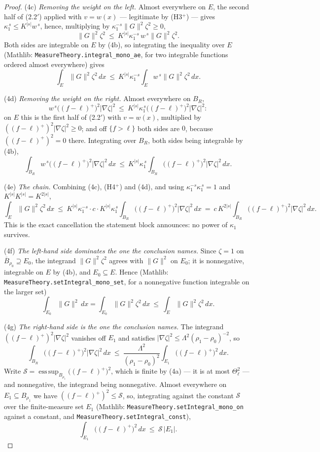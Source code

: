 \begin{proof}
\textup{(4c)} \emph{Removing the weight on the left.}  Almost everywhere on $E$,
the second half of (2.2$'$) applied with $v=w(x)$ --- legitimate by (H3$^+$) ---
gives $\kappa_1^{\,s}\le K^{|s|}w^{\,s}$, hence, multiplying by
$\kappa_1^{-s}\|G\|^2\zeta^2\ge0$,
\[
\|G\|^2\zeta^2\ \le\ K^{|s|}\kappa_1^{-s}\,w^{\,s}\|G\|^2\zeta^2 .
\]
Both sides are integrable on $E$ by (4b), so integrating the inequality over $E$
(Mathlib: \texttt{MeasureTheory.integral\_mono\_ae}, for two integrable
functions ordered almost everywhere) gives
\[
\int_E\|G\|^2\zeta^2\,dx\ \le\ K^{|s|}\kappa_1^{-s}\int_Ew^{\,s}\|G\|^2\zeta^2\,dx .
\]

\textup{(4d)} \emph{Removing the weight on the right.}  Almost everywhere on
$B_R$,
\[
w^{\,s}\bigl((f-\ell)^+\bigr)^2|\nabla\zeta|^2
\ \le\ K^{|s|}\kappa_1^{\,s}\bigl((f-\ell)^+\bigr)^2|\nabla\zeta|^2 :
\]
on $E$ this is the first half of (2.2$'$) with $v=w(x)$, multiplied by
$((f-\ell)^+)^2|\nabla\zeta|^2\ge0$; and off $\{f>\ell\}$ both sides are $0$,
because $((f-\ell)^+)^2=0$ there.  Integrating over $B_R$, both sides being
integrable by (4b),
\[
\int_{B_R}w^{\,s}\bigl((f-\ell)^+\bigr)^2|\nabla\zeta|^2\,dx
\ \le\ K^{|s|}\kappa_1^{\,s}\int_{B_R}\bigl((f-\ell)^+\bigr)^2|\nabla\zeta|^2\,dx .
\]

\textup{(4e)} \emph{The chain.}  Combining (4c), (H4$^+$) and (4d), and using
$\kappa_1^{-s}\kappa_1^{\,s}=1$ and $K^{|s|}K^{|s|}=K^{2|s|}$,
\[
\int_E\|G\|^2\zeta^2\,dx
\ \le\ K^{|s|}\kappa_1^{-s}\cdot c\cdot K^{|s|}\kappa_1^{\,s}
\int_{B_R}\bigl((f-\ell)^+\bigr)^2|\nabla\zeta|^2\,dx
\ =\ c\,K^{2|s|}\int_{B_R}\bigl((f-\ell)^+\bigr)^2|\nabla\zeta|^2\,dx .
\]
This is the exact cancellation the statement block announces: no power of
$\kappa_1$ survives.

\textup{(4f)} \emph{The left-hand side dominates the one the conclusion names.}
Since $\zeta=1$ on $\overline B_{\rho_0}\supseteq E_0$, the integrand
$\|G\|^2\zeta^2$ agrees with $\|G\|^2$ on $E_0$; it is nonnegative, integrable
on $E$ by (4b), and $E_0\subseteq E$.  Hence (Mathlib:
\texttt{MeasureTheory.setIntegral\_mono\_set}, for a nonnegative function
integrable on the larger set)
\[
\int_{E_0}\|G\|^2\,dx=\int_{E_0}\|G\|^2\zeta^2\,dx\ \le\ \int_E\|G\|^2\zeta^2\,dx .
\]

\textup{(4g)} \emph{The right-hand side is the one the conclusion names.}  The
integrand $((f-\ell)^+)^2|\nabla\zeta|^2$ vanishes off $E_1$ and satisfies
$|\nabla\zeta|^2\le\Lambda^2(\rho_1-\rho_0)^{-2}$, so
\[
\int_{B_R}\bigl((f-\ell)^+\bigr)^2|\nabla\zeta|^2\,dx
\ \le\ \frac{\Lambda^2}{(\rho_1-\rho_0)^2}\int_{E_1}\bigl((f-\ell)^+\bigr)^2\,dx .
\]
Write $\mathcal S=\operatorname{ess\,sup}_{B_{\rho_1}}\bigl((f-\ell)^+\bigr)^2$,
which is finite by (4a) --- it is at most $\Theta_\ell^2$ --- and nonnegative,
the integrand being nonnegative.  Almost everywhere on $E_1\subseteq B_{\rho_1}$
we have $((f-\ell)^+)^2\le\mathcal S$, so, integrating against the constant
$\mathcal S$ over the finite-measure set $E_1$ (Mathlib:
\texttt{MeasureTheory.setIntegral\_mono\_on} against a constant, and
\texttt{MeasureTheory.setIntegral\_const}),
\[
\int_{E_1}\bigl((f-\ell)^+\bigr)^2\,dx\ \le\ \mathcal S\,|E_1| .
\]


\end{proof}
